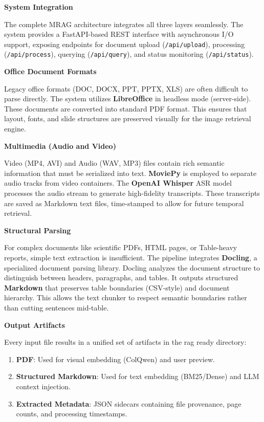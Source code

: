 \textbf{System Integration}

The complete MRAG architecture integrates all three layers seamlessly. The system provides a FastAPI-based REST interface with asynchronous I/O support, exposing endpoints for document upload (\texttt{/api/upload}), processing (\texttt{/api/process}), querying (\texttt{/api/query}), and status monitoring (\texttt{/api/status}).


\newpage

\textbf{Office Document Formats}

Legacy office formats (DOC, DOCX, PPT, PPTX, XLS) are often difficult to parse directly. 
The system utilizes \textbf{LibreOffice} in headless mode (server-side).
These documents are converted into standard PDF format. This ensures that layout, fonts, and slide structures are preserved visually for the image retrieval engine.


\textbf{Multimedia (Audio and Video)}

Video (MP4, AVI) and Audio (WAV, MP3) files contain rich semantic information that must be serialized into text.
\textbf{MoviePy} is employed to separate audio tracks from video containers.
The \textbf{OpenAI Whisper} ASR model processes the audio stream to generate high-fidelity transcripts. These transcripts are saved as Markdown text files, time-stamped to allow for future temporal retrieval.

\textbf{Structural Parsing}

For complex documents like scientific PDFs, HTML pages, or Table-heavy reports, simple text extraction is insufficient.
The pipeline integrates \textbf{Docling}, a specialized document parsing library.
Docling analyzes the document structure to distinguish between headers, paragraphs, and tables.
It outputs structured \textbf{Markdown} that preserves table boundaries (CSV-style) and document hierarchy. This allows the text chunker to respect semantic boundaries rather than cutting sentences mid-table.

\textbf{Output Artifacts}

Every input file results in a unified set of artifacts in the rag ready directory:
\begin{enumerate}
    \item \textbf{PDF}: Used for visual embedding (ColQwen) and user preview.
    \item \textbf{Structured Markdown}: Used for text embedding (BM25/Dense) and LLM context injection.
    \item \textbf{Extracted Metadata}: JSON sidecars containing file provenance, page counts, and processing timestamps.
\end{enumerate}

